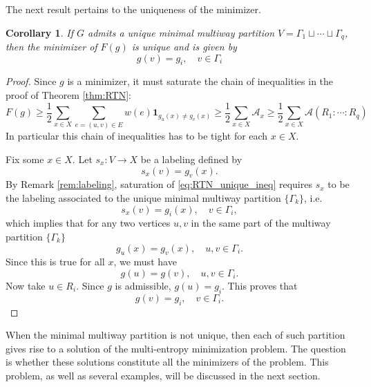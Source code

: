 \documentclass[11pt,oneside,letterpaper]{article}
\numberwithin{equation}{section}
\newtheorem{corollary}[theorem]{Corollary}
\theoremstyle{definition}
\theoremstyle{remark}
\begin{document}
The next result pertains to the uniqueness of the minimizer.
\begin{corollary}\label{cor:unique-mincut}
  If $G$ admits a unique minimal multiway partition $V=\Gamma_1\sqcup\cdots\sqcup \Gamma_q$, then the minimizer of $F(g)$ is unique and is given by
  \begin{equation}
    g(v) = g_i, \quad v\in \Gamma_i
  \end{equation}
\end{corollary}
\begin{proof}
  Since $g$ is a minimizer, it must saturate the chain of inequalities in the proof of Theorem \ref{thm:RTN}:
  \begin{equation}
    \label{eq:RTN_unique_ineq}
    F(g) \ge\frac{1}{2}\sum_{x\in X}\sum_{e=(u,v)\in E} w(e) \mathbf{1}_{g_u(x)\ne g_v(x)} \ge \frac{1}{2}\sum_{x\in X}\mathcal{A}_x \ge \frac{1}{2}\sum_{x\in X} \mathcal{A}(R_1:\cdots:R_q)
  \end{equation}
  In particular this chain of inequalities has to be tight for each $x\in X$.

  Fix some $x\in X$. Let $s_x:V\to X$ be a labeling defined by
  \begin{equation}
    s_x(v) = g_v(x).
  \end{equation}
  By Remark \ref{rem:labeling}, saturation of \eqref{eq:RTN_unique_ineq} requires $s_x$ to be the labeling associated to the unique minimal multiway partition $\{\Gamma_k\}$, i.e.
  \begin{equation}
    s_x(v) = g_i(x), \quad v\in \Gamma_i,
  \end{equation}
  which implies that for any two vertices $u,v$ in the same part of the multiway partition $\{\Gamma_k\}$
  \begin{equation}
    g_u(x)=g_v(x), \quad u,v\in \Gamma_i.
  \end{equation}
  Since this is true for all $x$, we must have
  \begin{equation}
    g(u)=g(v), \quad u,v\in \Gamma_i.
  \end{equation}
  Now take $u\in R_i$. Since $g$ is admissible, $g(u)=g_i$. This proves that
  \begin{equation}
    g(v) = g_i, \quad v\in \Gamma_i.
  \end{equation}
\end{proof}


When the minimal multiway partition is not unique, then each of such partition gives rise to a solution of the multi-entropy minimization problem. The question is whether these solutions constitute all the minimizers of the problem. This problem, as well as several examples, will be discussed in the next section.
\end{document}
